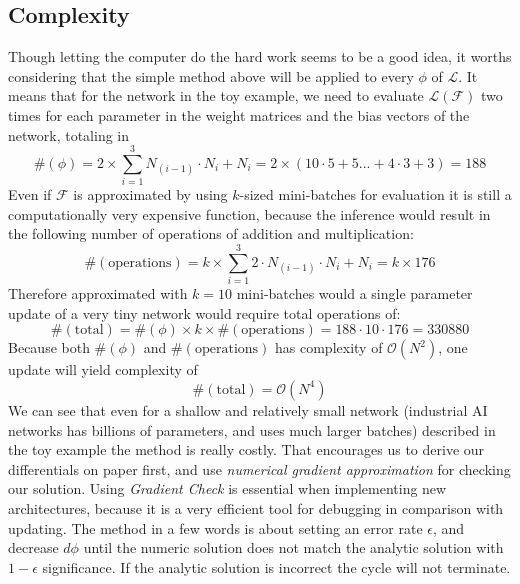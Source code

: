 \subsection{Complexity} 
Though letting the computer do the hard work seems to be a good idea, it worths considering that the simple method above will be applied to every $\phi$ of $\mathcal{L}$.
It means that for the network in the toy example, we need to evaluate $\mathcal{L}(\mathcal{F})$ two times for each parameter in 
the weight matrices and the bias vectors of the network, totaling in 
$$\#(\phi) = 2\times\sum_{i=1}^3 N_{(i-1)}\cdot N_i + N_i = 2\times(10\cdot 5 + 5 ... + 4\cdot 3 + 3) = 188$$
Even if $\mathcal{F}$ is approximated by using $k$-sized mini-batches for evaluation it is still a computationally very expensive function, because the inference would result in the following number of operations of addition and multiplication:
$$\#(\mathrm{operations}) = k\times\sum_{i=1}^3 2\cdot N_{(i-1)}\cdot N_i + N_i = k \times 176$$
Therefore approximated with $k=10$ mini-batches would a single parameter update of a very tiny network would require total operations of:
\begin{equation}
    \#(\mathrm{total})=\#(\phi) \times k \times \#(\mathrm{operations}) = 188 \cdot 10 \cdot 176  = 330880
\end{equation}
Because both $\#(\phi)$ and $\#(\mathrm{operations})$ has complexity of $\mathcal{O}(N^2)$, one update will yield complexity of 
\begin{equation}
    \#(\mathrm{total})=\mathcal{O}(N^4)
\end{equation}
We can see that even for a shallow and relatively small network (industrial AI networks has billions of parameters, and uses much larger batches) described in the toy example the method is really costly.
That encourages us to derive our differentials on paper first, and use \emph{numerical gradient approximation} for checking our solution. Using \emph{Gradient Check} is essential when implementing new architectures, because it is a very efficient tool for debugging in comparison with updating. The method in a few words is about setting an error rate $\epsilon$, and decrease $d\phi$ until the numeric solution does not match the analytic solution with $1-\epsilon$ significance. If the analytic solution is incorrect the cycle will not terminate.

